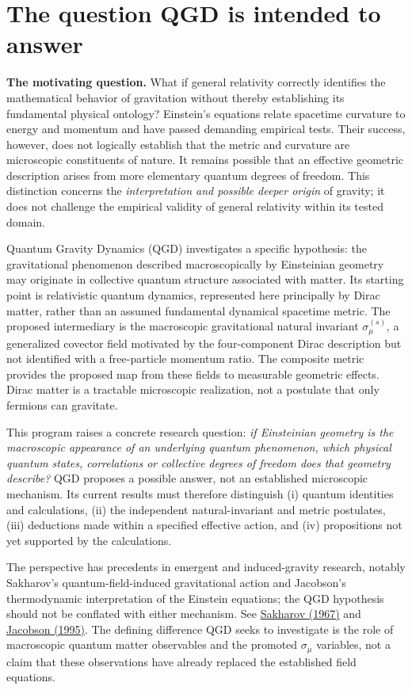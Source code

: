 \documentclass[11pt,a4paper]{article}
\begin{document}
\section{The question QGD is intended to answer}\label{sec:mission}
\noindent\textbf{The motivating question.} What if general relativity correctly identifies the mathematical behavior of gravitation without thereby establishing its fundamental physical ontology? Einstein's equations relate spacetime curvature to energy and momentum and have passed demanding empirical tests. Their success, however, does not logically establish that the metric and curvature are microscopic constituents of nature. It remains possible that an effective geometric description arises from more elementary quantum degrees of freedom. This distinction concerns the \emph{interpretation and possible deeper origin} of gravity; it does not challenge the empirical validity of general relativity within its tested domain.

Quantum Gravity Dynamics (QGD) investigates a specific hypothesis: the gravitational phenomenon described macroscopically by Einsteinian geometry may originate in collective quantum structure associated with matter. Its starting point is relativistic quantum dynamics, represented here principally by Dirac matter, rather than an assumed fundamental dynamical spacetime metric. The proposed intermediary is the macroscopic gravitational natural invariant $\sigma_\mu^{(s)}$, a generalized covector field motivated by the four-component Dirac description but not identified with a free-particle momentum ratio. The composite metric provides the proposed map from these fields to measurable geometric effects. Dirac matter is a tractable microscopic realization, not a postulate that only fermions can gravitate.

This program raises a concrete research question: \emph{if Einsteinian geometry is the macroscopic appearance of an underlying quantum phenomenon, which physical quantum states, correlations or collective degrees of freedom does that geometry describe?} QGD proposes a possible answer, not an established microscopic mechanism. Its current results must therefore distinguish (i) quantum identities and calculations, (ii) the independent natural-invariant and metric postulates, (iii) deductions made within a specified effective action, and (iv) propositions not yet supported by the calculations.

The perspective has precedents in emergent and induced-gravity research, notably Sakharov's quantum-field-induced gravitational action and Jacobson's thermodynamic interpretation of the Einstein equations; the QGD hypothesis should not be conflated with either mechanism. See \href{https://www.mathnet.ru/eng/dan33444}{Sakharov (1967)} and \href{https://doi.org/10.1103/PhysRevLett.75.1260}{Jacobson (1995)}. The defining difference QGD seeks to investigate is the role of macroscopic quantum matter observables and the promoted $\sigma_\mu$ variables, not a claim that these observations have already replaced the established field equations.
\end{document}
